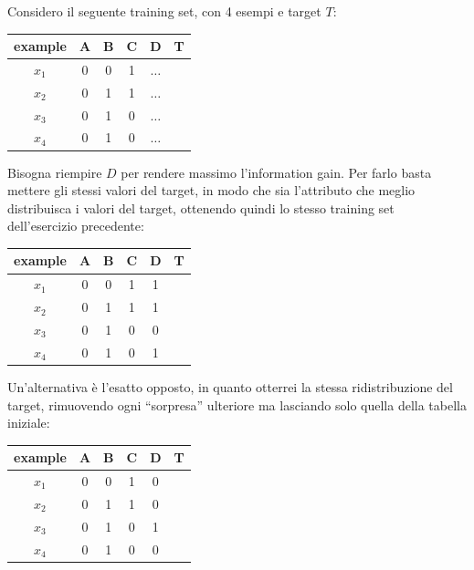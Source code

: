 \documentclass[a4paper,12pt, oneside]{book}
\begin{document}
\begin{esercizio}
  Considero il seguente training set, con 4 esempi e target $T$:
  \begin{table}[H]
    \centering
    \begin{tabular}{c|c|c|c|c|c}
      example & A & B & C & D & T\\
      \hline
      $x_1$ & 0 & 0 & 1 & $\ldots$ & \color{darkgreen}{1}\\
      $x_2$ & 0 & 1 & 1 & $\ldots$ & \color{darkgreen}{1}\\
      $x_3$ & 0 & 1 & 0 & $\ldots$ & \color{red}{0}\\
      $x_4$ & 0 & 1 & 0 & $\ldots$ & \color{darkgreen}{1}\\
    \end{tabular}
  \end{table}
  Bisogna riempire $D$ per rendere massimo l'information gain.
  \newpage
  Per farlo basta mettere gli stessi valori del target, in modo che sia
  l'attributo che meglio distribuisca i valori del target, ottenendo quindi lo
  stesso training set dell'esercizio precedente:
  \begin{table}[H]
    \centering
    \begin{tabular}{c|c|c|c|c|c}
      example & A & B & C & D & T\\
      \hline
      $x_1$ & 0 & 0 & 1 & 1 & \color{darkgreen}{1}\\
      $x_2$ & 0 & 1 & 1 & 1 & \color{darkgreen}{1}\\
      $x_3$ & 0 & 1 & 0 & 0 & \color{red}{0}\\
      $x_4$ & 0 & 1 & 0 & 1 & \color{darkgreen}{1}\\
    \end{tabular}
  \end{table}
  Un'alternativa è l'esatto opposto, in quanto otterrei la stessa
  ridistribuzione del target, rimuovendo ogni ``sorpresa'' ulteriore ma
  lasciando solo quella della tabella iniziale:
  \begin{table}[H]
    \centering
    \begin{tabular}{c|c|c|c|c|c}
      example & A & B & C & D & T\\
      \hline
      $x_1$ & 0 & 0 & 1 & 0 & \color{darkgreen}{1}\\
      $x_2$ & 0 & 1 & 1 & 0 & \color{darkgreen}{1}\\
      $x_3$ & 0 & 1 & 0 & 1 & \color{red}{0}\\
      $x_4$ & 0 & 1 & 0 & 0 & \color{darkgreen}{1}\\
    \end{tabular}
  \end{table}
\end{esercizio}
\end{document}
